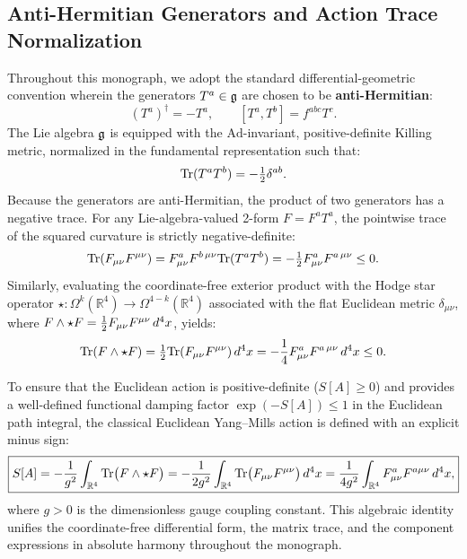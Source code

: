 \subsection{Anti-Hermitian Generators and Action Trace Normalization}
\label{subsec:action_trace_normalization}
Throughout this monograph, we adopt the standard differential-geometric convention wherein the generators $T^a \in \mathfrak{g}$ are chosen to be \textbf{anti-Hermitian}:
\begin{equation}
(T^a)^\dagger = -T^a, \qquad [T^a, T^b] = f^{abc} T^c.
\end{equation}
The Lie algebra $\mathfrak{g}$ is equipped with the $\mathrm{Ad}$-invariant, positive-definite Killing metric, normalized in the fundamental representation such that:
\begin{equation}
\label{eq:generator_trace_norm}
\mathrm{Tr}(T^a T^b) = -\tfrac{1}{2} \delta^{ab}.
\end{equation}
Because the generators are anti-Hermitian, the product of two generators has a negative trace. For any Lie-algebra-valued 2-form $F = F^a T^a$, the pointwise trace of the squared curvature is strictly negative-definite:
\begin{equation}
\mathrm{Tr}(F_{\mu\nu} F^{\mu\nu}) = F_{\mu\nu}^a F^{b\,\mu\nu} \mathrm{Tr}(T^a T^b) = -\tfrac{1}{2} F_{\mu\nu}^a F^{a\,\mu\nu} \le 0.
\end{equation}
Similarly, evaluating the coordinate-free exterior product with the Hodge star operator $\star : \Omega^k(\mathbb{R}^4) \to \Omega^{4-k}(\mathbb{R}^4)$ associated with the flat Euclidean metric $\delta_{\mu\nu}$, where $F \wedge \star F = \tfrac{1}{2} F_{\mu\nu} F^{\mu\nu} \, d^4x$, yields:
\begin{equation}
\label{eq:hodge_star_trace_density}
\mathrm{Tr}(F \wedge \star F) = \tfrac{1}{2} \mathrm{Tr}(F_{\mu\nu} F^{\mu\nu}) \, d^4x = -\frac{1}{4} F_{\mu\nu}^a F^{a\,\mu\nu} \, d^4x \le 0.
\end{equation}

To ensure that the Euclidean action is positive-definite ($S[A] \ge 0$) and provides a well-defined functional damping factor $\exp(-S[A]) \le 1$ in the Euclidean path integral, the classical Euclidean Yang--Mills action is defined with an explicit minus sign:
\begin{equation}
\label{eq:classical_ym_action_unified}
\boxed{
S[A] = -\frac{1}{g^2} \int_{\mathbb{R}^4} \mathrm{Tr}\bigl( F \wedge \star F \bigr) = -\frac{1}{2g^2} \int_{\mathbb{R}^4} \mathrm{Tr}\bigl( F_{\mu\nu} F^{\mu\nu} \bigr) \, d^4x = \frac{1}{4g^2} \int_{\mathbb{R}^4} F_{\mu\nu}^a F^{a\mu\nu} \, d^4x,
}
\end{equation}
where $g > 0$ is the dimensionless gauge coupling constant. This algebraic identity unifies the coordinate-free differential form, the matrix trace, and the component expressions in absolute harmony throughout the monograph.

